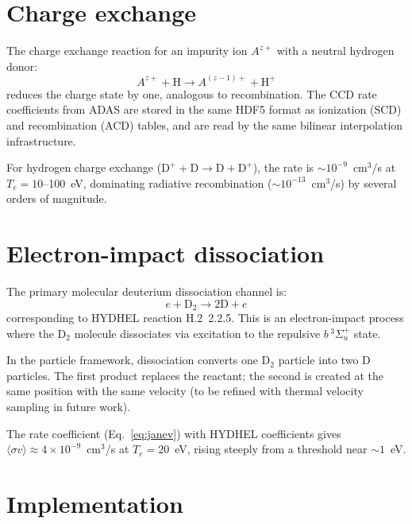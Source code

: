 \documentclass[preprint,12pt]{elsarticle}
\begin{document}
\section{Charge exchange}
\label{sec:cx}

The charge exchange reaction for an impurity ion $A^{z+}$ with a neutral hydrogen donor:
\begin{equation}
  A^{z+} + \text{H} \rightarrow A^{(z-1)+} + \text{H}^+
\end{equation}
reduces the charge state by one, analogous to recombination. The CCD rate coefficients
from ADAS are stored in the same HDF5 format as ionization (SCD) and recombination (ACD)
tables, and are read by the same bilinear interpolation infrastructure.

For hydrogen charge exchange ($\text{D}^+ + \text{D} \rightarrow \text{D} + \text{D}^+$),
the rate is $\sim 10^{-9}$~cm$^3$/s at $T_e = 10$--100~eV, dominating radiative
recombination ($\sim 10^{-13}$~cm$^3$/s) by several orders of magnitude.

\section{Electron-impact dissociation}
\label{sec:dissociation}

The primary molecular deuterium dissociation channel is:
\begin{equation}
  e + \text{D}_2 \rightarrow 2\text{D} + e
  \label{eq:dissoc}
\end{equation}
corresponding to HYDHEL reaction H.2~2.2.5. This is an electron-impact process where
the D$_2$ molecule dissociates via excitation to the repulsive $b\,^3\Sigma_u^+$ state.

In the particle framework, dissociation converts one D$_2$ particle into two D particles.
The first product replaces the reactant; the second is created at the same position with
the same velocity (to be refined with thermal velocity sampling in future work).

The rate coefficient (Eq.~\ref{eq:janev}) with HYDHEL coefficients gives
$\langle\sigma v\rangle \approx 4 \times 10^{-9}$~cm$^3$/s at $T_e = 20$~eV,
rising steeply from a threshold near $\sim 1$~eV.

\section{Implementation}
\label{sec:implementation}
\end{document}
